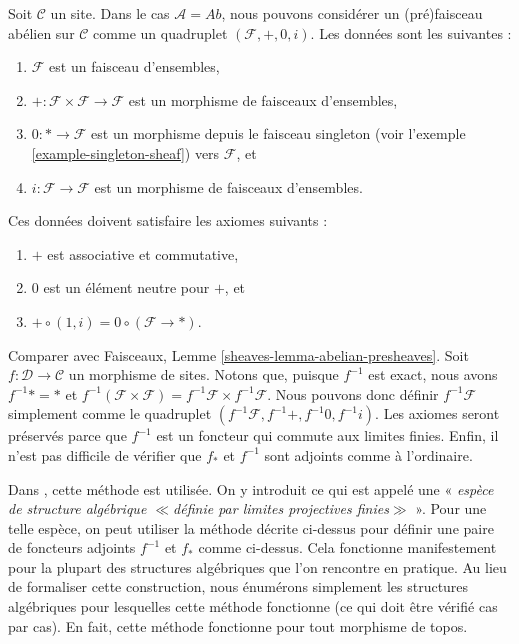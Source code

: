 \medskip\noindent
Soit $\mathcal{C}$ un site.
Dans le cas $\mathcal{A} = \textit{Ab}$,
nous pouvons considérer un (pré)faisceau abélien sur $\mathcal{C}$
comme un quadruplet $(\mathcal{F}, +, 0, i)$.
Les données sont les suivantes :
\begin{enumerate}
\item[(D1)] $\mathcal{F}$ est un faisceau d'ensembles,
\item[(D2)] $+ : \mathcal{F} \times \mathcal{F} \to \mathcal{F}$ est
un morphisme de faisceaux d'ensembles,
\item[(D3)] $0 : * \to \mathcal{F}$ est un morphisme depuis le
faisceau singleton (voir l'exemple \ref{example-singleton-sheaf})
vers $\mathcal{F}$, et
\item[(D4)] $i : \mathcal{F} \to \mathcal{F}$ est un morphisme de faisceaux
d'ensembles.
\end{enumerate}
Ces données doivent satisfaire les axiomes suivants :
\begin{enumerate}
\item[(A1)] $+$ est associative et commutative,
\item[(A2)] $0$ est un élément neutre pour $+$, et
\item[(A3)] $+ \circ (1, i) = 0 \circ (\mathcal{F} \to *)$.
\end{enumerate}
Comparer avec Faisceaux, Lemme \ref{sheaves-lemma-abelian-presheaves}.
Soit $f : \mathcal{D} \to \mathcal{C}$ un morphisme de sites.
Notons que, puisque $f^{-1}$ est exact, nous avons
$f^{-1}* = *$ et
$f^{-1}(\mathcal{F} \times \mathcal{F}) =
f^{-1}\mathcal{F} \times f^{-1}\mathcal{F}$.
Nous pouvons donc définir $f^{-1}\mathcal{F}$ simplement comme le quadruplet
$(f^{-1}\mathcal{F}, f^{-1}+, f^{-1}0, f^{-1}i)$. Les axiomes
seront préservés parce que $f^{-1}$ est un foncteur
qui commute aux limites finies. Enfin, il n'est pas difficile
de vérifier que $f_*$ et $f^{-1}$ sont adjoints comme à l'ordinaire.

\medskip\noindent
Dans \cite{SGA4}, cette méthode est utilisée. On y introduit ce
qui est appelé une « {\it esp\`ece de structure alg\'ebrique $\ll$d\'efinie
par limites projectives finies$\gg$} ». Pour une telle esp\`ece, on
peut utiliser la méthode décrite ci-dessus pour définir une paire de foncteurs adjoints
$f^{-1}$ et $f_*$ comme ci-dessus. Cela fonctionne manifestement pour la plupart
des structures algébriques que l'on rencontre en pratique.
Au lieu de formaliser cette construction, nous énumérons simplement les
structures algébriques pour lesquelles cette méthode fonctionne (ce qui doit être
vérifié cas par cas). En fait, cette méthode fonctionne pour tout
morphisme de topos.

